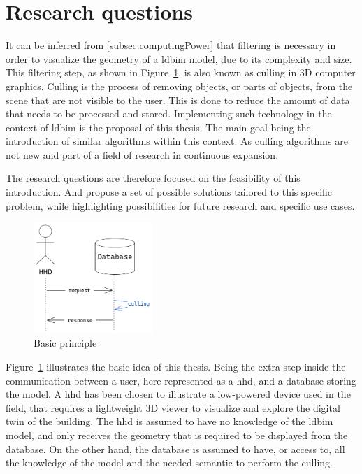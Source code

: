 \section{Research questions}
It can be inferred from \ref{subsec:computingPower} that filtering is necessary in order to visualize the geometry of a \ac{ldbim} model, due to its complexity and size. This filtering step, as shown in Figure~\ref{fig:firstIdea}, is also known as culling in 3D computer graphics. Culling is the process of removing objects, or parts of objects, from the scene that are not visible to the user. This is done to reduce the amount of data that needs to be processed and stored. Implementing such technology in the context of \ac{ldbim} is the proposal of this thesis. The main goal being the introduction of similar algorithms within this context. As culling algorithms are not new and part of a field of research in continuous expansion.

The research questions are therefore focused on the feasibility of this introduction. And propose a set of possible solutions tailored to this specific problem, while highlighting possibilities for future research and specific use cases.

\begin{figure}[h]
    \centering
    \includegraphics[width=0.4\textwidth]{figures/firstIdea.png}
    \caption{Basic principle}
    \label{fig:firstIdea}
\end{figure}
Figure~\ref{fig:firstIdea} illustrates the basic idea of this thesis. Being the extra step inside the communication between a user, here represented as a \ac{hhd}, and a database storing the model. A \ac{hhd} has been chosen to illustrate a low-powered device used in the field, that requires a lightweight 3D viewer to visualize and explore the digital twin of the building. The \ac{hhd} is assumed to have no knowledge of the \ac{ldbim} model, and only receives the geometry that is required to be displayed from the database. On the other hand, the database is assumed to have, or access to, all the knowledge of the model and the needed semantic to perform the culling.

